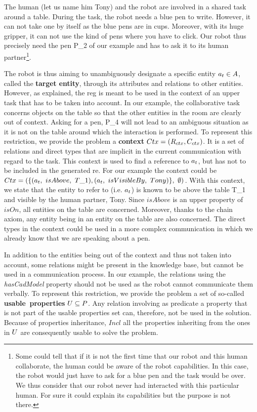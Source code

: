 The human (let us name him Tony) and the robot are involved in a shared task around a table. During the task, the robot needs a blue pen to write. However, it can not take one by itself as the blue pens are in cups. Moreover, with its huge gripper, it can not use the kind of pens where you have to click. Our robot thus precisely need the pen P\_2 of our example and has to ask it to its human partner\footnote{Some could tell that if it is not the first time that our robot and this human collaborate, the human could be aware of the robot capabilities. In this case, the robot would just have to ask for a blue pen and the task would be over. We thus consider that our robot never had interacted with this particular human. For sure it could explain its capabilities but the purpose is not there.}.

The robot is thus aiming to unambiguously designate a specific entity $a_t \in A$, called the \textbf{target entity}, through its attributes and relations to other entities. However, as explained, the \acrshort{reg} is meant to be used in the context of an upper task that has to be taken into account. In our example, the collaborative task concerns objects on the table so that the other entities in the room are clearly out of context. Asking for a pen, P\_4 will not lead to an ambiguous situation as it is not on the table around which the interaction is performed. To represent this restriction, we provide the problem a \textbf{context} $Ctx = (R_{ctx}, C_{ctx})$. It is a set of relations and direct types that are implicit in the current communication with regard to the task. This context is used to find a reference to $a_t$, but has not to be included in the generated \acrshort{re}. For our example the context could be $Ctx = (\{ (\goalindiv,\ isAbove,\ T\_1), (\goalindiv,\ isVisibleBy,\ Tony) \},\ \emptyset)$. With this context, we state that the entity to refer to (i.e. $a_t$) is known to be above the table T\_1 and visible by the human partner, Tony. Since $isAbove$ is an upper property of $isOn$, all entities on the table are concerned. Moreover, thanks to the chain axiom, any entity being in an entity on the table are also concerned. The direct types in the context could be used in a more complex communication in which we already know that we are speaking about a pen.

In addition to the entities being out of the context and thus not taken into account, some relations might be present in the knowledge base, but cannot be used in a communication process. In our example, the relations using the \textit{hasCadModel} property should not be used as the robot cannot communicate them verbally. To represent this restriction, we provide the problem a set of so-called \mbox{\textbf{usable properties}} $U \subseteq P$. Any relation involving as predicate a property that is not part of the usable properties set can, therefore, not be used in the solution. Because of properties inheritance, $Incl$ all the properties inheriting from the ones in $U$ are consequently usable to solve the problem. 


